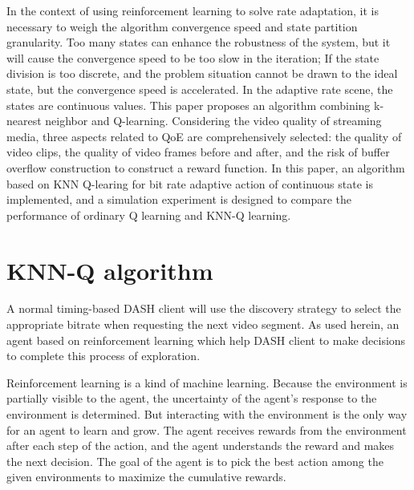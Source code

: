 \documentclass[twocolumn]{article}
\begin{document}
In the context of using reinforcement learning to solve rate adaptation, 
it is necessary to weigh the algorithm convergence speed and state partition granularity.
Too many states can enhance the robustness of the system, 
but it will cause the convergence speed to be too slow in the iteration; 
If the state division is too discrete, and the problem situation cannot 
be drawn to the ideal state, but the convergence speed is accelerated.
In the adaptive rate scene, the states are continuous values. 
This paper proposes an algorithm combining k-nearest neighbor and Q-learning.
Considering the video quality of streaming media, three aspects related to 
QoE are comprehensively selected: the quality of video clips, 
the quality of video frames before and after, and the risk of buffer 
overflow construction to construct a reward function.
In this paper, an algorithm based on KNN Q-learing for bit rate adaptive action of continuous state is implemented,
 and a simulation experiment is designed to compare the performance of 
 ordinary Q learning and KNN-Q learning.
\section{KNN-Q algorithm}
A normal timing-based DASH client will use the discovery strategy to select 
the appropriate bitrate when requesting the next video segment. 
As used herein, an agent based on reinforcement learning which help DASH client
 to make decisions to complete this process of exploration.

Reinforcement learning is a kind of machine learning. 
Because the environment is partially visible to the agent, the uncertainty of the 
agent's response to the environment is determined. 
But interacting with the environment is the only way for an agent to learn and grow. 
The agent receives rewards from the environment after each step of the action, 
and the agent understands the reward and makes the next decision. 
The goal of the agent is to pick the best action among the given environments to maximize the cumulative rewards\cite{RN13}.
\end{document}

